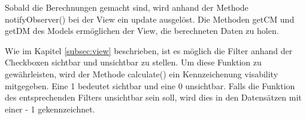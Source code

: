 Sobald die Berechnungen gemacht sind, wird anhand der Methode notifyObserver() bei der View ein update ausgelöst. Die Methoden getCM und getDM des Models ermöglichen der View, die berechneten Daten zu holen.

Wie im Kapitel \ref{subsec:view} beschrieben, ist es möglich die Filter anhand der Checkboxen sichtbar und unsichtbar zu stellen. Um diese Funktion zu gewährleisten, wird der Methode calculate() ein Kennzeichenung visability mitgegeben. Eine 1 bedeutet sichtbar und eine 0 unsichtbar. Falls die Funktion des entsprechenden Filters unsichtbar sein soll, wird dies in den Datensätzen mit einer - 1 gekennzeichnet. 

